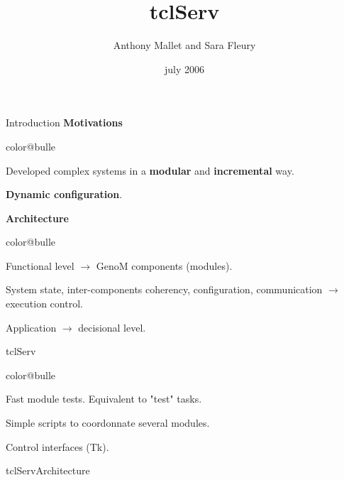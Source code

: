 \documentclass[a4paper,landscape,smooth]{show}
\title{\Huge tclServ}
\author{Anthony Mallet and Sara Fleury}
\date{july 2006}
\begin{document}
\maketitle

\def\figurepath{./:./fig}
\graphicspath{{./:./fig/}}


\begin{part}{Introduction}{}
   \vfill
   {\bf Motivations}
   \begin{bitemize}{color@bulle}
      \item Developed complex systems in a {\bf modular} and
	    {\bf incremental} way.
      \item {\bf Dynamic configuration}.
   \end{bitemize}
   \vfill
   {\bf Architecture}
   \begin{bitemize}{color@bulle}
      \item  Functional level $\rightarrow$ GenoM components (modules).
      \item System state,  inter-components coherency, configuration,
	    communication $\rightarrow$ execution control.
      \item Application $\rightarrow$ decisional level.
   \end{bitemize}
   \vfill
\end{part}

\begin{tslide}{tclServ}
   \vfill
   \begin{bitemize}{color@bulle}
      \item Fast module tests. Equivalent to
	    "test" tasks.
      \item Simple scripts to coordonnate several modules.
      \item Control interfaces (Tk).
   \end{bitemize}
   \vfill
\end{tslide}


\begin{part}{tclServ}{Architecture}
   \vfill
   \vfill
\end{part}

\end{document}
